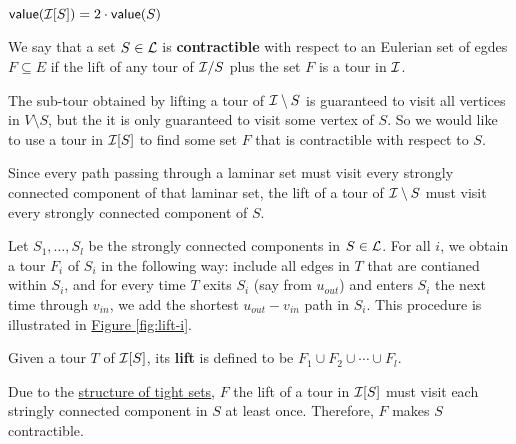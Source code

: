 \documentclass[./main.tex]{subfiles}
\begin{document}
	\begin{fact}
		$\textsf{\textup{value}}(\mathcal{I}[S]) = 2\cdot\textsf{\textup{value}}(S)$
	\end{fact}\vspace{2mm}

	\begin{definition}
		We say that a set $S \in \mathcal{L}$ is \textbf{contractible} with respect to an Eulerian set of egdes $F \subseteq E$ if the lift of any tour of $\mathcal{I}/S$ plus the set $F$ is a tour in $\mathcal{I}$.
	\end{definition}
	The sub-tour obtained by lifting a tour of $\mathcal{I}\setminus S$ is guaranteed to visit all vertices in $V\setminus S$, but the it is only guaranteed to visit some vertex of $S$. So we would like to use a tour in $\mathcal{I}[S]$ to find some set $F$ that is contractible with respect to $S$.

	Since every path passing through a laminar set must visit every strongly connected component of that laminar set, the lift of a tour of $\mathcal{I}\setminus S$ must visit every strongly connected component of $S$.

	Let $S_1, \dots, S_l$ be the strongly connected components in $S \in \mathcal{L}$.
	For all $i$, we obtain a tour $F_i$ of $S_i$ in the following way: include all edges in $T$ that are contianed within $S_i$, and for every time $T$ exits $S_i$ (say from $u_{out}$) and enters $S_i$ the next time through $v_{in}$, we add the shortest $u_{out} - v_{in}$ path in $S_i$.	This procedure is illustrated in \hyperref[fig:lift-i]{Figure \ref{fig:lift-i}}.
	\vspace{2mm}
	
	\begin{definition}\label{def:3:indu-lift}
		Given a tour $T$ of $\mathcal{I}[S]$, its \textbf{lift} is defined to be $F_1\cup F_2\cup\cdots\cup F_l$.
	\end{definition}




	Due to the \hyperref[fig:tightPath]{structure of tight sets}, $F$ the lift of a tour in $\mathcal{I}[S]$ must visit each stringly connected component in $S$ at least once. Therefore, $F$ makes $S$ contractible.\\
	
\end{document}
